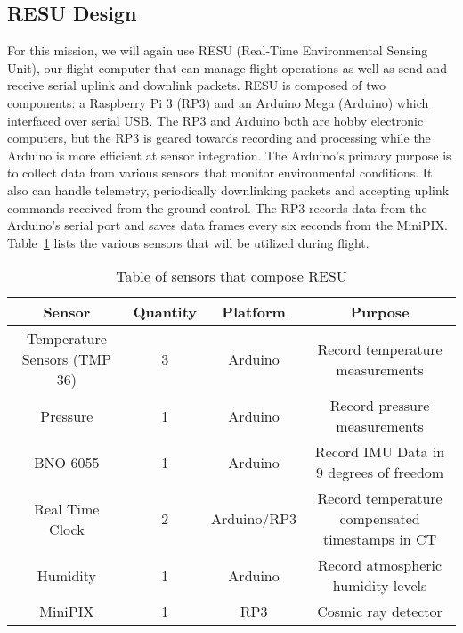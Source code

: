 \subsection{RESU Design}
\label{sec:RESU-Design}

For this mission, we will again use RESU (Real-Time Environmental Sensing Unit), our flight computer that can manage flight operations as well as send and receive serial uplink and downlink packets. RESU is composed of two components: a Raspberry Pi 3 (RP3) and an Arduino Mega (Arduino) which interfaced over serial USB.  The RP3 and Arduino both are hobby electronic computers, but the RP3 is geared towards recording and processing while the Arduino is more efficient at sensor integration.  The Arduino's primary purpose is to collect data from various sensors that monitor environmental conditions. It also can handle telemetry, periodically downlinking packets and accepting uplink commands received from the ground control. The RP3 records data from the Arduino's serial port and saves data frames every six seconds from the MiniPIX.  Table~\ref{tab:Sensors} lists the various sensors that will be utilized during flight.

\begin{table}[h!]
\centering
\caption{Table of sensors that compose RESU}
\label{tab:Sensors}
\bigskip
\begin{tabular}{|c|c|c|c|}
\hline
\multicolumn{1}{|c|}{\bfseries Sensor} & {\bfseries Quantity} & {\bfseries Platform} & {\bfseries Purpose} \\
\hline
    Temperature Sensors (TMP 36)	& 3 & Arduino  		& Record temperature measurements  \\ \hline
    Pressure        				& 1 & Arduino 		& Record pressure measurements \\ \hline
    BNO 6055       					& 1 & Arduino 		& Record IMU Data in 9 degrees of freedom \\ \hline    
    Real Time Clock 				& 2 & Arduino/RP3 	& Record temperature compensated timestamps in CT \\\hline
    Humidity        				& 1 & Arduino 		& Record atmospheric humidity levels \\ \hline
    MiniPIX         				& 1 & RP3     		& Cosmic ray detector \\ \hline
\end{tabular}
\end{table}

